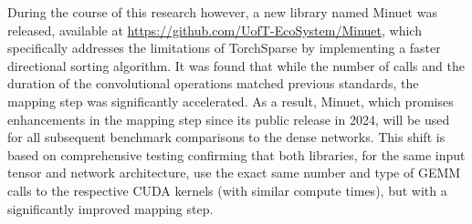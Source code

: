 \documentclass{article}
\begin{document}
During the course of this research however, a new library named Minuet was released, available at \url{https://github.com/UofT-EcoSystem/Minuet}, which specifically addresses the limitations of TorchSparse by implementing a faster directional sorting algorithm. It was found that while the number of calls and the duration of the convolutional operations matched previous standards, the mapping step was significantly accelerated. As a result, Minuet, which promises enhancements in the mapping step since its public release in 2024, will be used for all subsequent benchmark comparisons to the dense networks. This shift is based on comprehensive testing confirming that both libraries, for the same input tensor and network architecture, use the exact same number and type of GEMM calls to the respective CUDA kernels (with similar compute times), but with a significantly improved mapping step. 



\renewcommand\theadalign{bc} %
\renewcommand\theadfont{\bfseries} %
\renewcommand\theadgape{\Gape[4pt]} %
\setcellgapes{3pt} %
\end{document}
